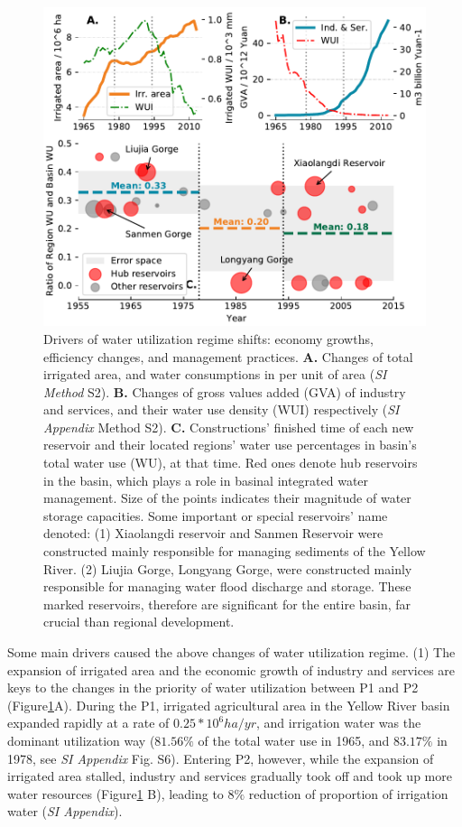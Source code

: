 \documentclass[9pt, twocolumn, twoside, lineno]{pnas-new}
\begin{document}
\begin{figure}%
	\centering
	\includegraphics[width=\linewidth]{../../figures/main/causes.pdf}
	\caption{
		Drivers of water utilization regime shifts: economy growths, efficiency changes, and management practices.
		\textbf{A.} Changes of total irrigated area, and water consumptions in per unit of area (\textit{SI Method} S2).
		\textbf{B.} Changes of gross values added (GVA) of industry and services, and their water use density (WUI) respectively (\textit{SI Appendix} Method S2).
		\textbf{C.} Constructions' finished time of each new reservoir and their located regions' water use percentages in basin's total water use (WU), at that time. Red ones denote hub reservoirs in the basin, which plays a role in basinal integrated water management. Size of the points indicates their magnitude of water storage capacities. Some important or special reservoirs' name denoted: (1) Xiaolangdi reservoir and Sanmen Reservoir were constructed mainly responsible for managing sediments of the Yellow River. (2) Liujia Gorge, Longyang Gorge, were constructed mainly responsible for managing water flood discharge and storage. These marked reservoirs, therefore are significant for the entire basin, far crucial than regional development.
	}
	\label{fig:Causes}
\end{figure}

Some main drivers caused the above changes of water utilization regime.
(1) The expansion of irrigated area and the economic growth of industry and services are keys to the changes in the priority of water utilization between P1 and P2 (Figure\ref{fig:Causes}A). During the P1, irrigated agricultural area in the Yellow River basin expanded rapidly at a rate of $0.25*10^6 ha/yr$, and irrigation water was the dominant utilization way ($81.56\%$ of the total water use in 1965, and $83.17\%$ in 1978, see \textit{SI Appendix} Fig. S6). Entering P2, however, while the expansion of irrigated area stalled, industry and services gradually took off and took up more water resources (Figure\ref{fig:Causes} B), leading to $8\%$ reduction of proportion of irrigation water (\textit{SI Appendix}).
\end{document}
